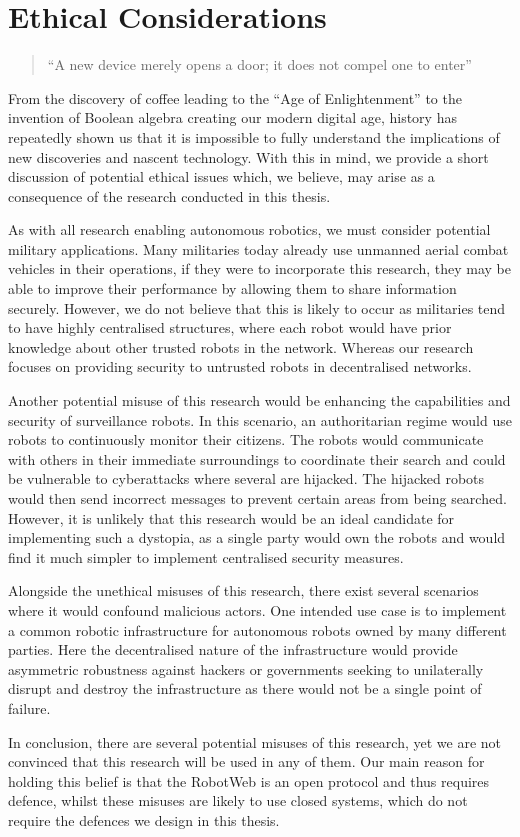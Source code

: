 \section{Ethical Considerations}

\begin{quote}
    \centering 
    ``A new device merely opens a door; it does not compel one to enter''\\
\end{quote}

From the discovery of coffee leading to the ``Age of Enlightenment'' to the invention of Boolean algebra creating our modern digital age, history has repeatedly shown us that it is impossible to fully understand the implications of new discoveries and nascent technology. With this in mind, we provide a short discussion of potential ethical issues which, we believe, may arise as a consequence of the research conducted in this thesis.

As with all research enabling autonomous robotics, we must consider potential military applications. Many militaries today already use unmanned aerial combat vehicles in their operations, if they were to incorporate this research, they may be able to improve their performance by allowing them to share information securely. However, we do not believe that this is likely to occur as militaries tend to have highly centralised structures, where each robot would have prior knowledge about other trusted robots in the network. Whereas our research focuses on providing security to untrusted robots in decentralised networks.

Another potential misuse of this research would be enhancing the capabilities and security of surveillance robots. In this scenario, an authoritarian regime would use robots to continuously monitor their citizens. The robots would communicate with others in their immediate surroundings to coordinate their search and could be vulnerable to cyberattacks where several are hijacked. The hijacked robots would then send incorrect messages to prevent certain areas from being searched. However, it is unlikely that this research would be an ideal candidate for implementing such a dystopia, as a single party would own the robots and would find it much simpler to implement centralised security measures.

Alongside the unethical misuses of this research, there exist several scenarios where it would confound malicious actors. One intended use case is to implement a common robotic infrastructure for autonomous robots owned by many different parties. Here the decentralised nature of the infrastructure would provide asymmetric robustness against hackers or governments seeking to unilaterally disrupt and destroy the infrastructure as there would not be a single point of failure.

In conclusion, there are several potential misuses of this research, yet we are not convinced that this research will be used in any of them. Our main reason for holding this belief is that the RobotWeb is an open protocol and thus requires defence, whilst these misuses are likely to use closed systems, which do not require the defences we design in this thesis.